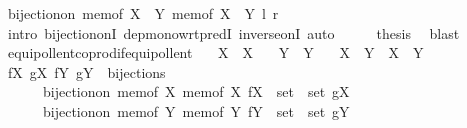 \begin{isabellebody}
\ {\isachardoublequoteopen}bijection{\isacharunderscore}{\kern0pt}on\ {\isacharparenleft}{\kern0pt}mem{\isacharunderscore}{\kern0pt}of\ {\isacharparenleft}{\kern0pt}X\ {\isasymunion}\ Y{\isacharparenright}{\kern0pt}{\isacharparenright}{\kern0pt}\ {\isacharparenleft}{\kern0pt}mem{\isacharunderscore}{\kern0pt}of\ {\isacharparenleft}{\kern0pt}X\ {\isasymCoprod}\ Y{\isacharparenright}{\kern0pt}{\isacharparenright}{\kern0pt}\ {\isacharquery}{\kern0pt}l\ {\isacharquery}{\kern0pt}r{\isachardoublequoteclose}\isanewline
\ \ \ \ \isamarkupfalse%
\ {\isacharparenleft}{\kern0pt}intro\ bijection{\isacharunderscore}{\kern0pt}onI\ dep{\isacharunderscore}{\kern0pt}mono{\isacharunderscore}{\kern0pt}wrt{\isacharunderscore}{\kern0pt}predI\ inverse{\isacharunderscore}{\kern0pt}onI{\isacharparenright}{\kern0pt}\ auto\isanewline
\ \ \isamarkupfalse%
\ \isamarkupfalse%
\ {\isacharquery}{\kern0pt}thesis\ \isamarkupfalse%
\ blast\isanewline
{}\isamarkupfalse%
%
\endisatagproof
{\isafoldproof}%
%
\isadelimproof
\isanewline
%
\endisadelimproof
\isanewline
{}\isamarkupfalse%
\ equipollent{\isacharunderscore}{\kern0pt}coprod{\isacharunderscore}{\kern0pt}if{\isacharunderscore}{\kern0pt}equipollent{\isacharcolon}{\kern0pt}\isanewline
\ \ \ {\isachardoublequoteopen}X\ {\isasymapprox}\ X{\isacharprime}{\kern0pt}{\isachardoublequoteclose}\isanewline
\ \ \ {\isachardoublequoteopen}Y\ {\isasymapprox}\ Y{\isacharprime}{\kern0pt}{\isachardoublequoteclose}\isanewline
\ \ \ {\isachardoublequoteopen}X\ {\isasymCoprod}\ Y\ {\isasymapprox}\ X{\isacharprime}{\kern0pt}\ {\isasymCoprod}\ Y{\isacharprime}{\kern0pt}{\isachardoublequoteclose}\isanewline
%
\isadelimproof
%
\endisadelimproof
%
\isatagproof
{}\isamarkupfalse%
\ {\isacharminus}{\kern0pt}\isanewline
\ \ \isamarkupfalse%
\ fX\ gX\ fY\ gY\ \ bijections{\isacharcolon}{\kern0pt}\isanewline
\ \ \ \ \ \ {\isachardoublequoteopen}bijection{\isacharunderscore}{\kern0pt}on\ {\isacharparenleft}{\kern0pt}mem{\isacharunderscore}{\kern0pt}of\ X{\isacharparenright}{\kern0pt}\ {\isacharparenleft}{\kern0pt}mem{\isacharunderscore}{\kern0pt}of\ X{\isacharprime}{\kern0pt}{\isacharparenright}{\kern0pt}\ {\isacharparenleft}{\kern0pt}fX\ {\isacharcolon}{\kern0pt}{\isacharcolon}{\kern0pt}\ set\ {\isasymRightarrow}\ set{\isacharparenright}{\kern0pt}\ gX{\isachardoublequoteclose}\isanewline
\ \ \ \ \ \ {\isachardoublequoteopen}bijection{\isacharunderscore}{\kern0pt}on\ {\isacharparenleft}{\kern0pt}mem{\isacharunderscore}{\kern0pt}of\ Y{\isacharparenright}{\kern0pt}\ {\isacharparenleft}{\kern0pt}mem{\isacharunderscore}{\kern0pt}of\ Y{\isacharprime}{\kern0pt}{\isacharparenright}{\kern0pt}\ {\isacharparenleft}{\kern0pt}fY\ {\isacharcolon}{\kern0pt}{\isacharcolon}{\kern0pt}\ set\ {\isasymRightarrow}\ set{\isacharparenright}{\kern0pt}\ gY{\isachardoublequoteclose}\isanewline

\end{isabellebody}
